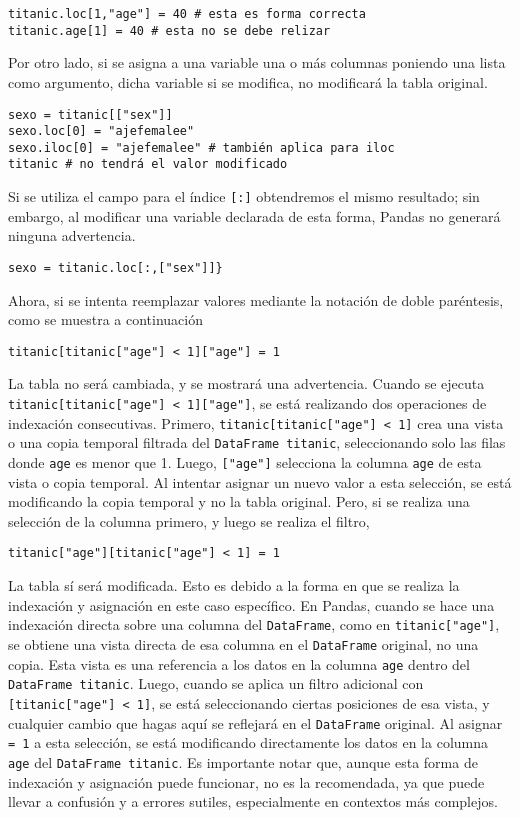 \begin{verbatim}
titanic.loc[1,"age"] = 40 # esta es forma correcta
titanic.age[1] = 40 # esta no se debe relizar
\end{verbatim}
\noindent Por otro lado, si se asigna a una variable una o más columnas poniendo una lista como argumento, dicha variable si se modifica, no modificará la tabla original.
\begin{verbatim}
sexo = titanic[["sex"]]
sexo.loc[0] = "ajefemalee"
sexo.iloc[0] = "ajefemalee" # también aplica para iloc
titanic # no tendrá el valor modificado
\end{verbatim}
\noindent Si se utiliza el campo para el índice \texttt{[:]} obtendremos el mismo resultado; sin embargo, al modificar una variable declarada de esta forma, Pandas no generará ninguna advertencia.
\begin{verbatim}
sexo = titanic.loc[:,["sex"]]}            
\end{verbatim}
Ahora, si se intenta reemplazar valores mediante la notación de doble paréntesis, como se muestra a continuación
\begin{verbatim}
titanic[titanic["age"] < 1]["age"] = 1
\end{verbatim}
\noindent La tabla no será cambiada, y se mostrará una advertencia. Cuando se ejecuta \texttt{titanic[titanic["age"] < 1]["age"]}, se está realizando dos operaciones de indexación consecutivas. Primero, \texttt{titanic[titanic["age"] < 1]} crea una vista o una copia temporal filtrada del \texttt{DataFrame titanic}, seleccionando solo las filas donde \texttt{age} es menor que 1. Luego, \texttt{["age"]} selecciona la columna \texttt{age} de esta vista o copia temporal. Al intentar asignar un nuevo valor a esta selección, se está modificando la copia temporal y no la tabla original.
\noindent Pero, si se realiza una selección de la columna primero, y luego se realiza el filtro,
\begin{verbatim}
titanic["age"][titanic["age"] < 1] = 1
\end{verbatim}
La tabla sí será modificada. Esto es debido a la forma en que se realiza la indexación y asignación en este caso específico. En Pandas, cuando se hace una indexación directa sobre una columna del \texttt{DataFrame}, como en \texttt{titanic["age"]}, se obtiene una vista directa de esa columna en el \texttt{DataFrame} original, no una copia. Esta vista es una referencia a los datos en la columna \texttt{age} dentro del \texttt{DataFrame titanic}. Luego, cuando se aplica un filtro adicional con \texttt{[titanic["age"] < 1]}, se está seleccionando ciertas posiciones de esa vista, y cualquier cambio que hagas aquí se reflejará en el \texttt{DataFrame} original. Al asignar \texttt{= 1} a esta selección, se está modificando directamente los datos en la columna \texttt{age} del \texttt{DataFrame titanic}. Es importante notar que, aunque esta forma de indexación y asignación puede funcionar, no es la recomendada, ya que puede llevar a confusión y a errores sutiles, especialmente en contextos más complejos. \\\
